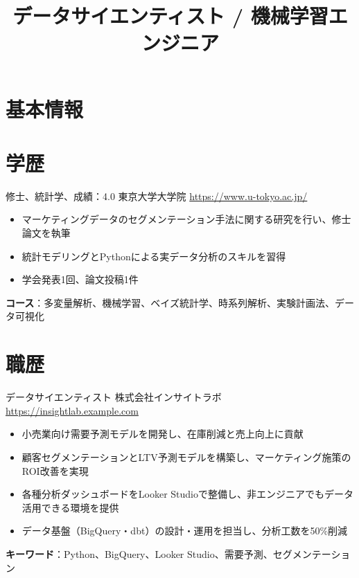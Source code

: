 \documentclass[a4paper, serif, 10pt]{moderncv}
\title{データサイエンティスト / 機械学習エンジニア}
\begin{document}
\maketitle

\section{基本情報}

\section{学歴}

        {修士、統計学、成績：4.0}
        {東京大学大学院}
        {\url{https://www.u-tokyo.ac.jp/}}
        {}
        {\begin{itemize}
\item マーケティングデータのセグメンテーション手法に関する研究を行い、修士論文を執筆
\item 統計モデリングとPythonによる実データ分析のスキルを習得
\item 学会発表1回、論文投稿1件
\end{itemize}
\textbf{コース}：多変量解析、機械学習、ベイズ統計学、時系列解析、実験計画法、データ可視化}
\section{職歴}

        {データサイエンティスト}
        {株式会社インサイトラボ}
        {\url{https://insightlab.example.com}}
        {}
        {\begin{itemize}
\item 小売業向け需要予測モデルを開発し、在庫削減と売上向上に貢献
\item 顧客セグメンテーションとLTV予測モデルを構築し、マーケティング施策のROI改善を実現
\item 各種分析ダッシュボードをLooker Studioで整備し、非エンジニアでもデータ活用できる環境を提供
\item データ基盤（BigQuery・dbt）の設計・運用を担当し、分析工数を50\%削減
\end{itemize}
\textbf{キーワード}：Python、BigQuery、Looker Studio、需要予測、セグメンテーション}
\end{document}
